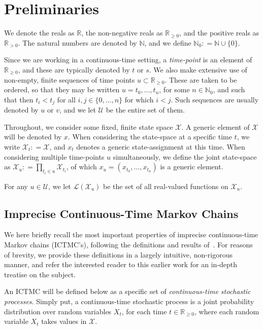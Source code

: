 \documentclass[twoside,11pt]{article}
\newcommand{\nats}{\mathbb{N}}
\newcommand{\natswith}{\nats_{0}}
\newcommand{\reals}{\mathbb{R}}
\newcommand{\realspos}{\reals_{>0}}
\newcommand{\realsnonneg}{\reals_{\geq 0}}
\newcommand{\states}{\mathcal{X}}
\newcommand{\gambles}{\mathcal{L}}
\newcommand{\coloneqq}{:\!=}
\begin{document}
\section{Preliminaries}\label{sec:prelim}

We denote the reals as $\reals$, the non-negative reals as $\realsnonneg$, and the positive reals as $\realspos$. The natural numbers are denoted by $\nats$, and we define $\natswith\coloneqq\nats\cup\{0\}$.

Since we are working in a continuous-time setting, a \emph{time-point} is an element of $\realsnonneg$, and these are typically denoted by $t$ or $s$. We also make extensive use of non-empty, finite sequences of time points $u\subset\realsnonneg$. These are taken to be ordered, so that they may be written $u=t_0,\ldots,t_n$, for some $n\in\natswith$, and such that then $t_i<t_j$ for all $i,j\in\{0,\ldots,n\}$ for which $i< j$. Such sequences are usually denoted by $u$ or $v$, and we let $\mathcal{U}$ be the entire set of them.

Throughout, we consider some fixed, finite state space $\states$. A generic element of $\states$ will be denoted by $x$. When considering the state-space at a specific time $t$, we write $\states_t\coloneqq\states$, and $x_t$ denotes a generic state-assignment at this time. When considering multiple time-points $u$ simultaneously, we define the joint state-space as $\states_u\coloneqq\prod_{t_i\in u}\states_{t_i}$, of which $x_u=(x_{t_0},\ldots,x_{t_n})$ is a generic element.

For any $u\in\mathcal{U}$, we let $\gambles(\states_u)$ be the set of all real-valued functions on $\states_u$.

\subsection{Imprecise Continuous-Time Markov Chains}\label{subsec:ictmc}

We here briefly recall the most important properties of imprecise continuous-time Markov chains (ICTMC's), following the definitions and results of~\citet{krak2016ictmc}. For reasons of brevity, we provide these definitions in a largely intuitive, non-rigorous manner, and refer the interested reader to this earlier work for an in-depth treatise on the subject.

An ICTMC will be defined below as a specific set of \emph{continuous-time stochastic processes}. Simply put, a continuous-time stochastic process is a joint probability distribution over random variables $X_t$, for each time $t\in\realsnonneg$, where each random variable $X_t$ takes values in $\states$. 
\end{document}
